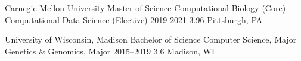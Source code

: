 \begin{cventries}
    \cvdegree
        {Carnegie Mellon University}
        {Master of Science}
        {Computational Biology (Core)}
        {Computational Data Science (Elective)}
        {2019-2021}
        {3.96}
        {Pittsburgh, PA}
        
    \cvdegree
        {University of Wisconsin, Madison}
        {Bachelor of Science}
        {Computer Science, Major}
        {Genetics \& Genomics, Major}
        {2015--2019}
        {3.6}
        {Madison, WI}
\end{cventries}

\vspace{-8mm}


